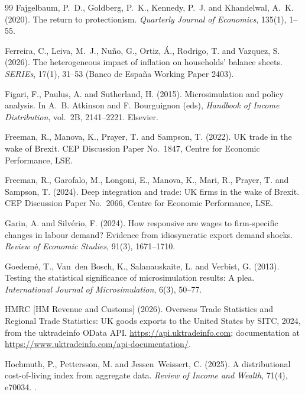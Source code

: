 \begin{thebibliography}{99}
Fajgelbaum, P.~D., Goldberg, P.~K., Kennedy, P.~J. and Khandelwal, A.~K. (2020).
\newblock The return to protectionism.
\newblock \emph{Quarterly Journal of Economics}, 135(1), 1--55.

Ferreira, C., Leiva, M.~J., Nu\~{n}o, G., Ortiz, \'A., Rodrigo, T. and Vazquez, S. (2026).
\newblock The heterogeneous impact of inflation on households' balance sheets.
\newblock \emph{SERIEs}, 17(1), 31--53 (Banco de Espa\~{n}a Working Paper 2403).

Figari, F., Paulus, A. and Sutherland, H. (2015).
\newblock Microsimulation and policy analysis.
\newblock In A.~B. Atkinson and F. Bourguignon (eds), \emph{Handbook of Income Distribution}, vol.~2B, 2141--2221. Elsevier.

Freeman, R., Manova, K., Prayer, T. and Sampson, T. (2022).
\newblock UK trade in the wake of Brexit.
\newblock CEP Discussion Paper No.~1847, Centre for Economic Performance, LSE.

Freeman, R., Garofalo, M., Longoni, E., Manova, K., Mari, R., Prayer, T. and Sampson, T. (2024).
\newblock Deep integration and trade: UK firms in the wake of Brexit.
\newblock CEP Discussion Paper No.~2066, Centre for Economic Performance, LSE.

Garin, A. and Silv\'{e}rio, F. (2024).
\newblock How responsive are wages to firm-specific changes in labour demand? Evidence from idiosyncratic export demand shocks.
\newblock \emph{Review of Economic Studies}, 91(3), 1671--1710.

Goedem\'e, T., Van~den Bosch, K., Salanauskaite, L. and Verbist, G. (2013).
\newblock Testing the statistical significance of microsimulation results: A plea.
\newblock \emph{International Journal of Microsimulation}, 6(3), 50--77.

HMRC [HM Revenue and Customs] (2026).
\newblock Overseas Trade Statistics and Regional Trade Statistics: UK goods exports to the United States by SITC, 2024, from the uktradeinfo OData API.
\newblock \url{https://api.uktradeinfo.com}; documentation at \url{https://www.uktradeinfo.com/api-documentation/}.

Hochmuth, P., Pettersson, M. and Jessen~Weissert, C. (2025).
\newblock A distributional cost-of-living index from aggregate data.
\newblock \emph{Review of Income and Wealth}, 71(4), e70034. .


\end{thebibliography}
